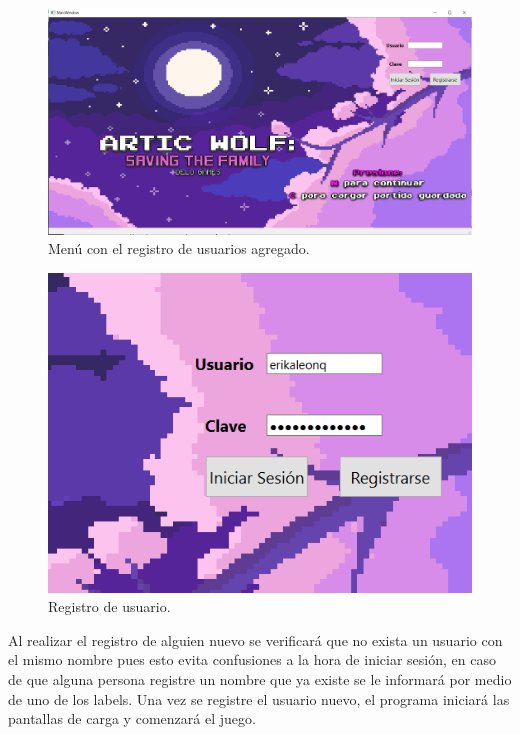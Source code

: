 \documentclass{article}
\begin{document}
\newpage
\begin{figure}[h]
\includegraphics[scale=0.4]{Images/menuregistro.png}
\centering
\caption{Menú con el registro de usuarios agregado.}
\label{fig:menuregis}
\end{figure}

\begin{figure}[h]
\includegraphics[scale=0.9]{Images/registro.png}
\centering
\caption{Registro de usuario.}
\label{fig:regis}
\end{figure}

Al realizar el registro de alguien nuevo se verificará que no exista un usuario con el mismo nombre pues esto evita confusiones a la hora de iniciar sesión, en caso de que alguna persona registre un nombre que ya existe se le informará por medio de uno de los labels. Una vez se registre el usuario nuevo, el programa iniciará las pantallas de carga y comenzará el juego.
\end{document}
